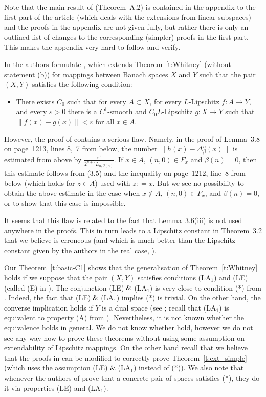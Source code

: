 \documentclass[a4paper,twoside,10pt,reqno,draft]{amsart}
\theoremstyle{definition}
\theoremstyle{remark}
\newcommand\norm[1]{\mathopen\|#1\mathclose\|}
\newcommand\ve{\varepsilon}
\newcommand\eqdef{\mathrel{\mathop:}=}
\newcommand\pLA[1]{(LA$_#1$)}
\newcommand\pLE{(LE)}
\let\land=\And
\begin{document}
Note that the main result of \cite{JS1} (Theorem~A.2) is contained in the appendix to the first part of the article (which deals with the extensions from linear subspaces)
and the proofs in the appendix are not given fully, but rather there is only an outlined list of changes to the corresponding (simpler) proofs in the first part.
This makes the appendix very hard to follow and verify.

In \cite{JS2} the authors formulate \cite[Theorem 3.1]{JS2}, which extends Theorem~\ref{t:Whitney} (without statement (b)) for mappings between Banach spaces $X$ and $Y$
such that the pair $(X,Y)$ satisfies the following condition:
\begin{itemize}
\item[(*)\quad]There exists $C_0$ such that for every $A\subset X$, for every $L$-Lipschitz $f\colon A\to Y$, and every $\ve>0$ there is a $C^1$-smooth and $C_0L$\nobreakdash-Lipschitz $g\colon X\to Y$ such that $\norm{f(x)-g(x)}<\ve$ for all $x\in A$.
\end{itemize}

However, the proof of \cite[Theorem 3.1]{JS2} contains a serious flaw.
Namely, in the proof of Lemma~3.8 on page~1213, lines 8,~7 from below, the number $\norm{h(x)-\Delta^n_{\beta}(x)}$ is estimated from above by $\frac{\ve'}{2^{n+2}L_{n,\beta(n)}}$.
If $x\in A$, $(n,0)\in F_x$ and $\beta(n)=0$, then this estimate follows from (3.5) and the inequality on page~1212, line~8 from below (which holds for $z\in A$) used with $z\eqdef x$.
But we see no possibility to obtain the above estimate in the case when $x\notin A$, $(n,0)\in F_x$, and $\beta(n)=0$, or to show that this case is impossible.

It seems that this flaw is related to the fact that Lemma~3.6(iii) is not used anywhere in the proofs.
This in turn leads to a Lipschitz constant in Theorem~3.2 that we believe is erroneous (and which is much better than the Lipschitz constant given by the authors in the real case, \cite[Theorem~A.2]{JS1}).

Our Theorem~\ref{t:basic-C1} shows that the generalisation of Theorem~\ref{t:Whitney} holds if we suppose that the pair $(X,Y)$ satisfies conditions \pLA1 and {\pLE} (called (E) in \cite{JS2}).
The conjunction {\pLE}$\land$\pLA1 is very close to condition (*) from \cite{JS2}.
Indeed, the fact that {\pLE}$\land$\pLA1 implies (*) is trivial.
On the other hand, the converse implication holds if $Y$ is a dual space (see \cite[Remark~1.3(2)]{JS2}; recall that \pLA1 is equivalent to property (A) from \cite{JS2}).
Nevertheless, it is not known whether the equivalence holds in general.
We do not know whether \cite[Theorems 3.1, 3.2]{JS2} hold,
however we do not see any way how to prove these theorems without using some assumption on extendability of Lipschitz mappings.
On the other hand recall that we believe that the proofs in \cite{JS2} can be modified to correctly prove Theorem~\ref{t:ext_simple} (which uses the assumption {\pLE}$\land$\pLA1 instead of (*)).
We also note that whenever the authors of \cite{JS2} prove that a concrete pair of spaces satisfies (*), they do it via properties {\pLE} and \pLA1.
\end{document}
